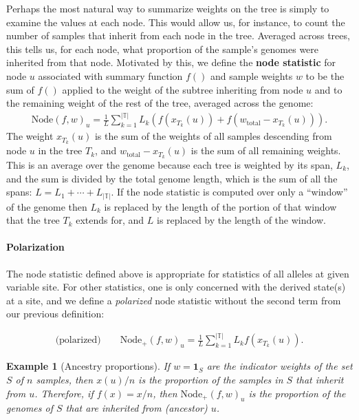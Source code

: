 \documentclass[9pt,twoside,lineno]{gsajnl}
\newcommand{\bone}{\mathbf{1}}
\newtheorem{example}{Example}
\newcommand{\node}{\mbox{Node}} %
\newcommand{\nodep}{\mbox{Node}_+} %
\newcommand{\treeseq}{\mathbb{T}} %
\newcommand{\iw}{w} %
\newcommand{\tiw}{w_\text{total}} %
\newcommand{\nw}{x} %
\begin{document}
Perhaps the most natural way to summarize weights on the tree
is simply to examine the values at each node.
This would allow us, for instance, to
count the number of samples that inherit from each node in the tree.
Averaged across trees,
this tells us, for each node, what proportion of the sample's genomes were inherited from that node.
Motivated by this, we define the
\textbf{node statistic} for node $u$
associated with summary function $f()$ and sample weights $\iw$
to be the sum of $f()$ applied to the weight of the subtree inheriting from node $u$
and to the remaining weight of the rest of the tree,
averaged across the genome:
\begin{align}
    \node(f, \iw)_u
    =
    \frac{1}{L} \sum_{k=1}^{|\treeseq|} L_k \left( f(\nw_{T_k}(u)) + f(\tiw - \nw_{T_k}(u)) \right).
\end{align}
The weight $\nw_{T_k}(u)$ is the sum of the weights of all samples descending from node $u$
in the tree $T_k$,
and $\tiw - \nw_{T_k}(u)$ is the sum of all remaining weights.
This is an average over the genome because each tree is weighted by its span, $L_k$,
and the sum is divided by the total genome length,
which is the sum of all the spans: $L = L_1 + \cdots + L_{|\treeseq|}$.
If the node statistic is computed over only a ``window'' of the genome
then $L_k$ is replaced by the length of the portion of that window that the tree $T_k$ extends for,
and $L$ is replaced by the length of the window.

\paragraph{Polarization}
The node statistic defined above is appropriate for statistics of all alleles at given variable site.
For other statistics, one is only concerned with the derived state(s) at a site,
and we define a \emph{polarized} node statistic without the second term from our previous definition:

\begin{align}
    \text{(polarized)} \qquad
    \nodep(f, \iw)_u
    =
    \frac{1}{L} \sum_{k=1}^{|\treeseq|} L_k f(\nw_{T_k}(u)) .
\end{align}

\begin{example}[Ancestry proportions] \label{ex:ancestry_props}
    If $\iw = \bone_S$ are the indicator weights of the set $S$ of $n$ samples,
    then $\nw(u) / n$ is the proportion of the samples in $S$ that inherit from $u$.
    Therefore, if $f(x) = x / n$,
    then $\nodep(f, \iw)_u$ is the proportion of the genomes of $S$
    that are inherited from (ancestor) $u$.
\end{example}
\end{document}
